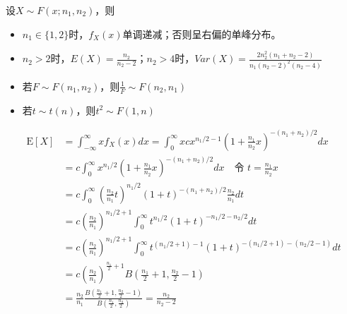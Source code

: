 \documentclass[UTF-8]{ctexbeamer}
\begin{document}
\begin{frame}
  \begin{Thm}
    设$X\sim F(x;n_{1},n_{2})$，则
    \begin{itemize}
    \item $n_{1}\in \{1,2\}$时，$f_{X}(x)$单调递减；否则呈右偏的单峰分布。
    \item $n_{2}>2$时，$E(X)=\frac{n_{2}}{n_{2}-2}$；$n_{2}>4$时，$Var(X)=\frac{2n_{2}^{2}(n_{1}+n_{2}-2)}{n_{1}(n_{2}-2)^{2}(n_{2}-4)}$
    \item 若$F\sim F(n_{1},n_{2})$，则$\frac{1}{F}\sim F(n_{2},n_{1})$
    \item 若$t\sim t(n)$，则$t^{2}\sim F(1,n)$
    \end{itemize}
  \end{Thm}
\end{frame}

\begin{frame}
 \[
\begin{aligned}
\mathrm{E}[X] &=\int_{-\infty}^{\infty} x f_{X}(x) d x =\int_{0}^{\infty} x c x^{n_{1} / 2-1}\left(1+\frac{n_{1}}{n_{2}} x\right)^{-\left(n_{1}+n_{2}\right) / 2} d x \\
&=c \int_{0}^{\infty} x^{n_{1} / 2}\left(1+\frac{n_{1}}{n_{2}} x\right)^{-\left(n_{1}+n_{2}\right) / 2} d x \quad \text{令 }t=\frac{n_1}{n_2}x\\
&=c \int_{0}^{\infty}\left(\frac{n_{2}}{n_{1}} t\right)^{n_{1} / 2}(1+t)^{-\left(n_{1}+n_{2}\right) / 2} \frac{n_{2}}{n_{1}} d t \\
&=c\left(\frac{n_{2}}{n_{1}}\right)^{n_{1} / 2+1} \int_{0}^{\infty} t^{n_{1} / 2}(1+t)^{-n_{1} / 2-n_{2} / 2} d t \\
&=c\left(\frac{n_{2}}{n_{1}}\right)^{n_{1} / 2+1} \int_{0}^{\infty} t^{\left(n_{1} / 2+1\right)-1}(1+t)^{-\left(n_{1} / 2+1\right)-\left(n_{2} / 2-1\right)} d t \\
&=c(\frac{n_2}{n_1})^{\frac{n_1}{2}+1}B(\frac{n_1}{2}+1,\frac{n_2}{2}-1)\\
&=\frac{n_{2}}{n_{1}} \frac{B(\frac{n_1}{2}+1,\frac{n_2}{2}-1)}{B\left(\frac{n_{1}}{2}, \frac{n_{2}}{2}\right)}=\frac{n_{2}}{n_{2}-2}
\end{aligned}
\]
\end{frame}
\end{document}

